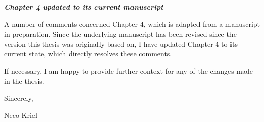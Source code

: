 \documentclass[11pt,a4paper]{article}
\newcommand{\centeredrule}{%
    \par\noindent
    \makebox[\textwidth][c]{\rule{0.75\textwidth}{0.5pt}}
    \par
}
\begin{document}
\textit{\textbf{Chapter 4 updated to its current manuscript}}

A number of comments concerned Chapter 4, which is adapted from a manuscript in preparation. Since the underlying manuscript has been revised since the version this thesis was originally based on, I have updated Chapter 4 to its current state, which directly resolves these comments.

\vspace{0.25cm}
\centeredrule
\vspace{0.25cm}

If necessary, I am happy to provide further context for any of the changes made in the thesis.

\vspace{0.5cm}
Sincerely,

\vspace{0.5cm}
Neco Kriel
\end{document}
